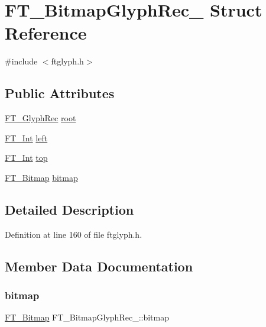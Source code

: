 \hypertarget{struct_f_t___bitmap_glyph_rec__}{}\section{F\+T\+\_\+\+Bitmap\+Glyph\+Rec\+\_\+ Struct Reference}
\label{struct_f_t___bitmap_glyph_rec__}


{\ttfamily \#include $<$ftglyph.\+h$>$}

\subsection*{Public Attributes}
\begin{DoxyCompactItemize}
\item 
\mbox{\hyperlink{ftglyph_8h_a095b515f46c978b33ffc9c20aad081a4}{F\+T\+\_\+\+Glyph\+Rec}} \mbox{\hyperlink{struct_f_t___bitmap_glyph_rec___ac3970353fbc0fe3d4c59c3fd608140f3}{root}}
\item 
\mbox{\hyperlink{fttypes_8h_af90e5fb0d07e21be9fe6faa33f02484c}{F\+T\+\_\+\+Int}} \mbox{\hyperlink{struct_f_t___bitmap_glyph_rec___a6cfd2d89af7b6be4af886047c9cb7e0a}{left}}
\item 
\mbox{\hyperlink{fttypes_8h_af90e5fb0d07e21be9fe6faa33f02484c}{F\+T\+\_\+\+Int}} \mbox{\hyperlink{struct_f_t___bitmap_glyph_rec___a25fc81296678d6a2d064843c01bc05f7}{top}}
\item 
\mbox{\hyperlink{ftimage_8h_ae28691030f2d16376937cf5e3485f921}{F\+T\+\_\+\+Bitmap}} \mbox{\hyperlink{struct_f_t___bitmap_glyph_rec___a16ecd0725920f8d5ad4c14e9448126ad}{bitmap}}
\end{DoxyCompactItemize}


\subsection{Detailed Description}


Definition at line 160 of file ftglyph.\+h.



\subsection{Member Data Documentation}
\mbox{\label{struct_f_t___bitmap_glyph_rec___a16ecd0725920f8d5ad4c14e9448126ad}} 
\subsubsection{\texorpdfstring{bitmap}{bitmap}}
{\footnotesize\ttfamily \mbox{\hyperlink{ftimage_8h_ae28691030f2d16376937cf5e3485f921}{F\+T\+\_\+\+Bitmap}} F\+T\+\_\+\+Bitmap\+Glyph\+Rec\+\_\+\+::bitmap}



